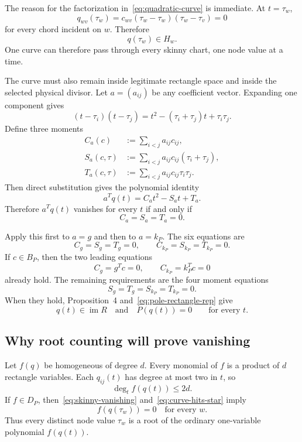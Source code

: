 \documentclass[11pt]{article}
\theoremstyle{definition}
\newcommand{\im}{\operatorname{im}}
\begin{document}
The reason for the factorization in~\eqref{eq:quadratic-curve} is immediate.  At $t=\tau_w$,
\[
q_{wv}(\tau_w)
=c_{wv}(\tau_w-\tau_w)(\tau_w-\tau_v)
=0
\]
for every chord incident on $w$.  Therefore
\begin{equation}
q(\tau_w)\in H_w.
\label{eq:curve-hits-star}
\end{equation}
One curve can therefore pass through every skinny chart, one node value at a time.

The curve must also remain inside legitimate rectangle space and inside the selected physical divisor.  Let $a=(a_{ij})$ be any coefficient vector.  Expanding one component gives
\[
(t-\tau_i)(t-\tau_j)
=t^2-(\tau_i+\tau_j)t+\tau_i\tau_j.
\]
Define three moments
\begin{align}
C_a(c)&:=\sum_{i<j}a_{ij}c_{ij},\label{eq:Ca}\\
S_a(c,\tau)&:=\sum_{i<j}a_{ij}c_{ij}(\tau_i+\tau_j),\label{eq:Sa}\\
T_a(c,\tau)&:=\sum_{i<j}a_{ij}c_{ij}\tau_i\tau_j.\label{eq:Ta}
\end{align}
Then direct substitution gives the polynomial identity
\begin{equation}
a^Tq(t)=C_a t^2-S_a t+T_a.
\label{eq:moment-expansion}
\end{equation}
Therefore $a^Tq(t)$ vanishes for every $t$ if and only if
\begin{equation}
C_a=S_a=T_a=0.
\label{eq:three-moments}
\end{equation}

Apply this first to $a=g$ and then to $a=k_P$.  The six equations are
\begin{equation}
C_g=S_g=T_g=0,
\qquad
C_{k_P}=S_{k_P}=T_{k_P}=0.
\label{eq:six-moments}
\end{equation}
If $c\in B_P$, then the two leading equations
\[
C_g=g^Tc=0,
\qquad
C_{k_P}=k_P^Tc=0
\]
already hold.  The remaining requirements are the four moment equations
\begin{equation}
S_g=T_g=S_{k_P}=T_{k_P}=0.
\label{eq:four-moments}
\end{equation}
When they hold, Proposition~4 and~\eqref{eq:pole-rectangle-rep} give
\[
q(t)\in\im R
\quad\text{and}\quad
P(q(t))=0
\qquad\text{for every }t.
\]

\subsection{Why root counting will prove vanishing}

Let $f(q)$ be homogeneous of degree $d$.  Every monomial of $f$ is a product of $d$ rectangle variables.  Each $q_{ij}(t)$ has degree at most two in $t$, so
\begin{equation}
\deg_t f(q(t))\le2d.
\label{eq:pullback-degree}
\end{equation}
If $f\in D_P$, then~\eqref{eq:skinny-vanishing} and~\eqref{eq:curve-hits-star} imply
\begin{equation}
f(q(\tau_w))=0
\quad\text{for every }w.
\label{eq:nodal-roots}
\end{equation}
Thus every distinct node value $\tau_w$ is a root of the ordinary one-variable polynomial $f(q(t))$.
\end{document}
